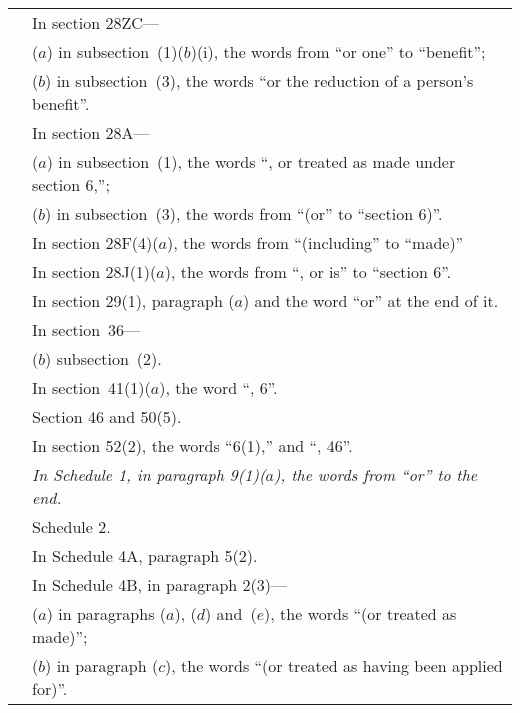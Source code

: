 \documentclass[12pt,a4paper]{article}
\begin{document}
\begin{longtable}{p{137.53691pt}p{228.4536pt}}
&In section 28ZC—\\
&\hspace*{1em}($a$) in subsection~(1)($b$)(i), the words from “or \hspace*{1em}one” to “benefit”;\\
&\hspace*{1em}($b$) in subsection~(3), the words “or the reduc\-\hspace*{1em}tion of a person's benefit”. \\
&In section 28A—\\
&\hspace*{1em}($a$)
in subsection~(1), the words “, or treated \hspace*{1em}as made under section 6,”;\\
&\hspace*{1em}($b$)
in subsection~(3), the words from “(or” to \hspace*{1em}“section 6)”. \\
&In section 28F(4)($a$), the words from “(including” to “made)”\\
&In section 28J(1)($a$), the words from “, or is” to “section 6”. \\
&In section 29(1), paragraph ($a$) and the word “or” at the end of it. \\
&In section~36—\\
&\hspace*{1em}($b$) subsection~(2). \\
&In section~41(1)($a$), the word “, 6”. \\
&Section 46 and 50(5).\\
&In section 52(2), the words “6(1),” and “, 46”. \\
&\emph{In Schedule 1, in paragraph 9(1)($a$), the words from “or” to the end.}\\
&Schedule 2.\\
&In Schedule 4A, paragraph 5(2).\\
&In Schedule 4B, in paragraph 2(3)—\\
&\hspace*{1em}($a$)
in paragraphs ($a$), ($d$) and~($e$), the words \hspace*{1em}“(or treated as made)”;\\
&\hspace*{1em}($b$)
in paragraph ($c$), the words “(or treated as \hspace*{1em}having been applied for)”. \\

\end{longtable}
\end{document}
